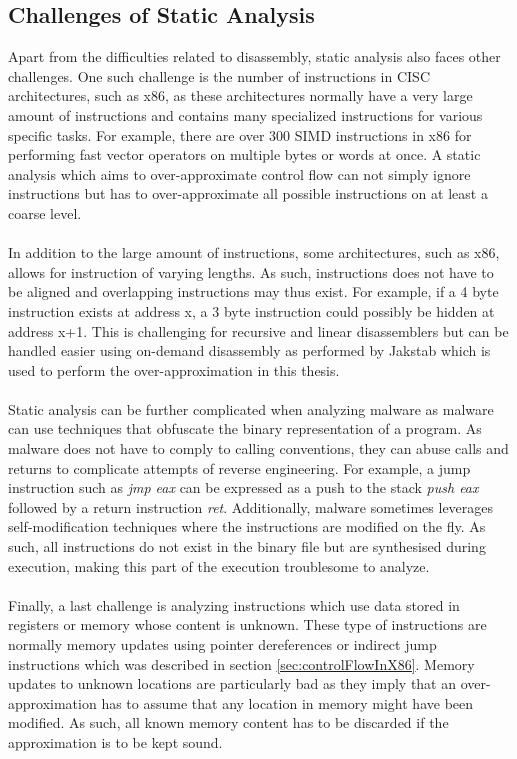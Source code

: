 \documentclass{kththesis}
\newcommand{\fbcomment}[1]{{#1}}
\renewcommand{\fbcomment}[1]{}
\renewcommand{\it}[1]{\textit{#1}}
\begin{document}
\subsection{Challenges of Static Analysis}
\fbcomment{\color{red}Goal: Describe what makes static analysis difficult(For example, instructions of varying sizes).}
Apart from the difficulties related to disassembly, static analysis also faces other challenges. One such challenge is the number of instructions in CISC architectures, such as x86, as these architectures normally have a very large amount of instructions and contains many specialized instructions for various specific tasks\cite{intelX86Manual}. For example, there are over 300 SIMD instructions in x86 for performing fast vector operators on multiple bytes or words at once\cite{vectorInstructions}. A static analysis which aims to over-approximate control flow can not simply ignore instructions but has to over-approximate all possible instructions on at least a coarse level. 
\\ \\
In addition to the large amount of instructions, some architectures, such as x86, allows for instruction of varying lengths. As such, instructions does not have to be aligned and overlapping instructions may thus exist. For example, if a 4 byte instruction exists at address x, a 3 byte instruction could possibly be hidden at address x+1. This is challenging for recursive and linear disassemblers but can be handled easier using on-demand disassembly as performed by Jakstab which is used to perform the over-approximation in this thesis. 
\\ \\
Static analysis can be further complicated when analyzing malware as malware can use techniques that obfuscate the binary representation of a program\cite{StaticDisAndCodeAnal}. As malware does not have to comply to calling conventions, they can abuse calls and returns to complicate attempts of reverse engineering. For example, a jump instruction such as \it{jmp eax} can be expressed as a push to the stack \it{push eax} followed by a return instruction \it{ret}. Additionally, malware sometimes leverages self-modification techniques where the instructions are modified on the fly. As such, all instructions do not exist in the binary file but are synthesised during execution, making this part of the execution troublesome to analyze.
\\ \\
Finally, a last challenge is analyzing instructions which use data stored in registers or memory whose content is unknown. These type of instructions are normally memory updates using pointer dereferences or indirect jump instructions which was described in section \ref{sec:controlFlowInX86}\cite{Jakstab}. Memory updates to unknown locations are particularly bad as they imply that an over-approximation has to assume that any location in memory might have been modified. As such, all known memory content has to be discarded if the approximation is to be kept sound.
\end{document}

